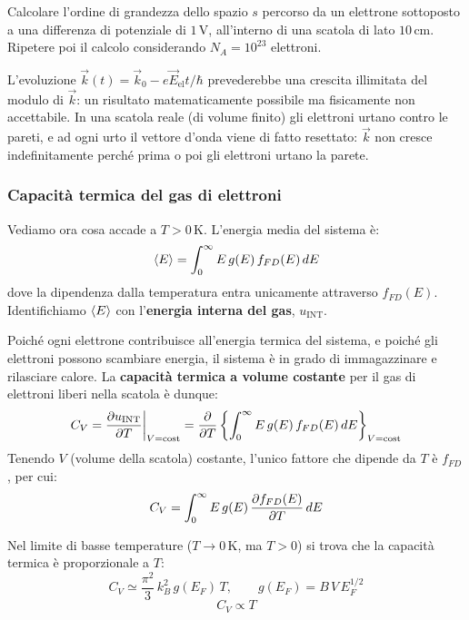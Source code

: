 \begin{exercise}
Calcolare l'ordine di grandezza dello spazio \(s\) percorso da un elettrone sottoposto a una differenza di potenziale di \(1\,\text{V}\), all'interno di una scatola di lato \(10\,\text{cm}\). Ripetere poi il calcolo considerando \(N_A = 10^{23}\) elettroni.
\end{exercise}

L'evoluzione \(\vec{k}(t) = \vec{k}_0 - e \vec{E}_{\text{el}} t / \hbar\) prevederebbe una crescita illimitata del modulo di \(\vec{k}\): un risultato matematicamente possibile ma fisicamente non accettabile. In una scatola reale (di volume finito) gli elettroni urtano contro le pareti, e ad ogni urto il vettore d'onda viene di fatto resettato: \(\vec{k}\) non cresce indefinitamente perché prima o poi gli elettroni urtano la parete.

\subsubsection{Capacità termica del gas di elettroni}

Vediamo ora cosa accade a \(T > 0\,\text{K}\). L'energia media del sistema è:
\begin{equation}
    \expval{E} = \int_0^{\infty} E\, g(E)\, f_{FD}(E)\, dE
\end{equation}
dove la dipendenza dalla temperatura entra unicamente attraverso \(f_{FD}(E)\). Identifichiamo \(\expval{E}\) con l'\textbf{energia interna del gas}, \(u_{\text{INT}}\).

Poiché ogni elettrone contribuisce all'energia termica del sistema, e poiché gli elettroni possono scambiare energia, il sistema è in grado di immagazzinare e rilasciare calore. La \textbf{capacità termica a volume costante} per il gas di elettroni liberi nella scatola è dunque:
\begin{equation}
    C_V = \pdv{u_{\text{INT}}}{T} \bigg|_{V = \text{cost}}
        = \pdv{T} \left\{ \int_0^{\infty} E\, g(E)\, f_{FD}(E)\, dE \right\}_{V = \text{cost}}
\end{equation}
Tenendo \(V\) (volume della scatola) costante, l'unico fattore che dipende da \(T\) è \(f_{FD}\), per cui:
\begin{equation}
    C_V = \int_0^{\infty} E\, g(E)\, \pdv{f_{FD}(E)}{T}\, dE
\end{equation}

Nel limite di basse temperature (\(T \to 0\,\text{K}\), ma \(T > 0\)) si trova che la capacità termica è proporzionale a \(T\):
\begin{equation}
    C_V \simeq \frac{\pi^2}{3}\, k_B^2\, g(E_F)\, T, \qquad g(E_F) = B\, V\, E_F^{1/2}
\end{equation}
    \begin{equation}
        C_V \propto T
    \end{equation}

